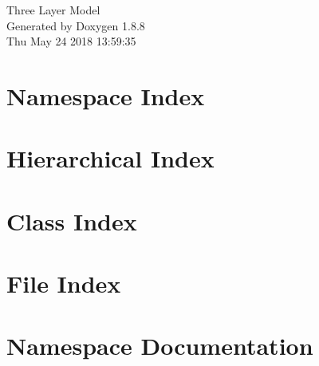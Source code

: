 \documentclass[twoside]{book}
\newcommand{\+}{\discretionary{\mbox{\scriptsize$\hookleftarrow$}}{}{}}
\newcommand{\clearemptydoublepage}{%
  \newpage{\pagestyle{empty}\cleardoublepage}%
}
\begin{document}
\hypersetup{pageanchor=false,
             bookmarks=true,
             bookmarksnumbered=true,
             pdfencoding=unicode
            }
\begin{titlepage}
\vspace*{7cm}
\begin{center}%
{\Large Three Layer Model }\\
\vspace*{1cm}
{\large Generated by Doxygen 1.8.8}\\
\vspace*{0.5cm}
{\small Thu May 24 2018 13:59:35}\\
\end{center}
\end{titlepage}
\clearemptydoublepage
\tableofcontents
\clearemptydoublepage
{}
\hypersetup{pageanchor=true}

\chapter{Namespace Index}

\chapter{Hierarchical Index}

\chapter{Class Index}

\chapter{File Index}

\chapter{Namespace Documentation}







\end{document}
